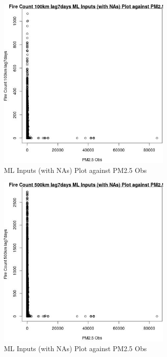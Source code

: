 \begin{figure} 
\centering  
\includegraphics[width=0.77\textwidth]{Code_Outputs/Report_ML_input_PM25_Step4_part_f_de_duplicated_aves_prioritize_24hr_obswNAs_Fire_Count_100km_lag7daysvPM25_Obs.jpg} 
\caption{\label{fig:Report_ML_input_PM25_Step4_part_f_de_duplicated_aves_prioritize_24hr_obswNAsFire_Count_100km_lag7daysvPM25_Obs}ML Inputs (with NAs) Plot against PM2.5 Obs} 
\end{figure} 
 

\begin{figure} 
\centering  
\includegraphics[width=0.77\textwidth]{Code_Outputs/Report_ML_input_PM25_Step4_part_f_de_duplicated_aves_prioritize_24hr_obswNAs_Fire_Count_500km_lag7daysvPM25_Obs.jpg} 
\caption{\label{fig:Report_ML_input_PM25_Step4_part_f_de_duplicated_aves_prioritize_24hr_obswNAsFire_Count_500km_lag7daysvPM25_Obs}ML Inputs (with NAs) Plot against PM2.5 Obs} 
\end{figure} 
 

